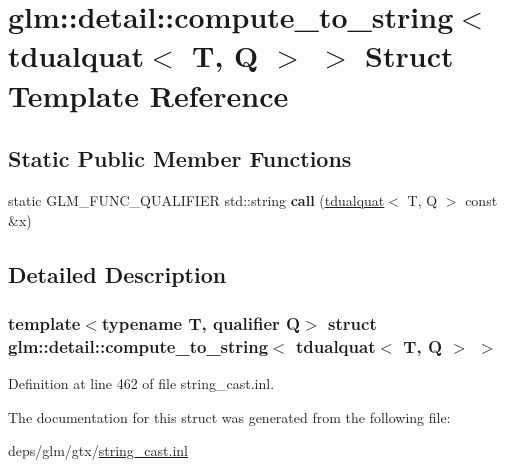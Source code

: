 \hypertarget{structglm_1_1detail_1_1compute__to__string_3_01tdualquat_3_01T_00_01Q_01_4_01_4}{}\section{glm\+:\+:detail\+:\+:compute\+\_\+to\+\_\+string$<$ tdualquat$<$ T, Q $>$ $>$ Struct Template Reference}
\label{structglm_1_1detail_1_1compute__to__string_3_01tdualquat_3_01T_00_01Q_01_4_01_4}
\subsection*{Static Public Member Functions}
\begin{DoxyCompactItemize}
\item 
\mbox{\label{structglm_1_1detail_1_1compute__to__string_3_01tdualquat_3_01T_00_01Q_01_4_01_4_a312a529ab87f8e85ad185676dd31267d}} 
static G\+L\+M\+\_\+\+F\+U\+N\+C\+\_\+\+Q\+U\+A\+L\+I\+F\+I\+ER std\+::string {\bfseries call} (\hyperlink{structglm_1_1tdualquat}{tdualquat}$<$ T, Q $>$ const \&x)
\end{DoxyCompactItemize}


\subsection{Detailed Description}
\subsubsection*{template$<$typename T, qualifier Q$>$\newline
struct glm\+::detail\+::compute\+\_\+to\+\_\+string$<$ tdualquat$<$ T, Q $>$ $>$}



Definition at line 462 of file string\+\_\+cast.\+inl.



The documentation for this struct was generated from the following file\+:\begin{DoxyCompactItemize}
\item 
deps/glm/gtx/\hyperlink{string__cast_8inl}{string\+\_\+cast.\+inl}\end{DoxyCompactItemize}

